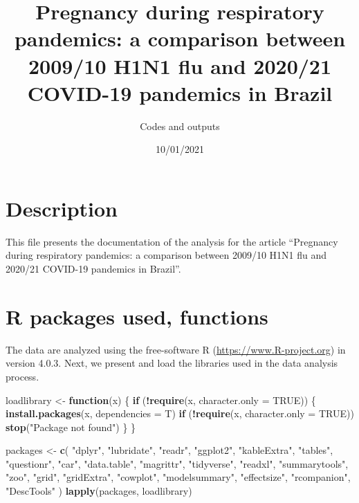 \documentclass[
]{article}
\title{Pregnancy during respiratory pandemics: a comparison between 2009/10
H1N1 flu and 2020/21 COVID-19 pandemics in Brazil}
\author{Codes and outputs}
\date{10/01/2021}
\newenvironment{Shaded}{\begin{snugshade}}{\end{snugshade}}
\newcommand{\ControlFlowTok}[1]{\textcolor[rgb]{0.13,0.29,0.53}{\textbf{#1}}}
\newcommand{\DataTypeTok}[1]{\textcolor[rgb]{0.13,0.29,0.53}{#1}}
\newcommand{\KeywordTok}[1]{\textcolor[rgb]{0.13,0.29,0.53}{\textbf{#1}}}
\newcommand{\NormalTok}[1]{#1}
\newcommand{\OperatorTok}[1]{\textcolor[rgb]{0.81,0.36,0.00}{\textbf{#1}}}
\newcommand{\OtherTok}[1]{\textcolor[rgb]{0.56,0.35,0.01}{#1}}
\newcommand{\StringTok}[1]{\textcolor[rgb]{0.31,0.60,0.02}{#1}}
\begin{document}
\maketitle

\hypertarget{description}{%
\section{Description}\label{description}}

This file presents the documentation of the analysis for the article
``Pregnancy during respiratory pandemics: a comparison between 2009/10
H1N1 flu and 2020/21 COVID-19 pandemics in Brazil''.

\hypertarget{r-packages-used-functions}{%
\section{R packages used, functions}\label{r-packages-used-functions}}

The data are analyzed using the free-software R
(\url{https://www.R-project.org}) in version 4.0.3. Next, we present and
load the libraries used in the data analysis process.

\begin{Shaded}
\begin{Highlighting}[]
\NormalTok{loadlibrary <-}\StringTok{ }\ControlFlowTok{function}\NormalTok{(x) \{}
  \ControlFlowTok{if}\NormalTok{ (}\OperatorTok{!}\KeywordTok{require}\NormalTok{(x, }\DataTypeTok{character.only =} \OtherTok{TRUE}\NormalTok{)) \{}
    \KeywordTok{install.packages}\NormalTok{(x, }\DataTypeTok{dependencies =}\NormalTok{ T)}
    \ControlFlowTok{if}\NormalTok{ (}\OperatorTok{!}\KeywordTok{require}\NormalTok{(x, }\DataTypeTok{character.only =} \OtherTok{TRUE}\NormalTok{))}
      \KeywordTok{stop}\NormalTok{(}\StringTok{"Package not found"}\NormalTok{)}
\NormalTok{  \}}
\NormalTok{\}}

\NormalTok{packages <-}
\StringTok{  }\KeywordTok{c}\NormalTok{(}
    \StringTok{"dplyr"}\NormalTok{,}
    \StringTok{"lubridate"}\NormalTok{,}
    \StringTok{"readr"}\NormalTok{,}
    \StringTok{"ggplot2"}\NormalTok{,}
    \StringTok{"kableExtra"}\NormalTok{,}
    \StringTok{"tables"}\NormalTok{,}
    \StringTok{"questionr"}\NormalTok{,}
    \StringTok{"car"}\NormalTok{,}
    \StringTok{"data.table"}\NormalTok{,}
    \StringTok{"magrittr"}\NormalTok{,}
    \StringTok{"tidyverse"}\NormalTok{,}
    \StringTok{"readxl"}\NormalTok{,}
    \StringTok{"summarytools"}\NormalTok{,}
    \StringTok{"zoo"}\NormalTok{,}
    \StringTok{"grid"}\NormalTok{,}
    \StringTok{"gridExtra"}\NormalTok{,}
    \StringTok{"cowplot"}\NormalTok{,}
    \StringTok{"modelsummary"}\NormalTok{,}
    \StringTok{"effectsize"}\NormalTok{,}
    \StringTok{"rcompanion"}\NormalTok{,}
    \StringTok{"DescTools"}
\NormalTok{  )}
\KeywordTok{lapply}\NormalTok{(packages, loadlibrary)}
\end{Highlighting}
\end{Shaded}
\end{document}
